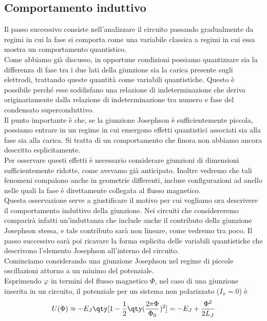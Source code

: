 \subsection{Comportamento induttivo}
Il passo successivo consiste nell'analizzare il circuito passando gradualmente da regimi in cui la fase si comporta come una variabile classica a regimi in cui essa mostra un comportamento quantistico.\\
Come abbiamo già discusso, in opportune condizioni possiamo quantizzare sia la differenza di fase tra i due lati della giunzione sia la carica presente sugli elettrodi, trattando queste quantità come variabili quantistiche. Questo è possibile perché esse soddisfano una relazione di indeterminazione che deriva originariamente dalla relazione di indeterminazione tra numero e fase del condensato superconduttivo.\\
Il punto importante è che, se la giunzione Josephson è sufficientemente piccola, possiamo entrare in un regime in cui emergono effetti quantistici associati sia alla fase sia alla carica. Si tratta di un comportamento che finora non abbiamo ancora descritto esplicitamente.\\
Per osservare questi effetti è necessario considerare giunzioni di dimensioni sufficientemente ridotte, come avevamo già anticipato. Inoltre vedremo che tali fenomeni compaiono anche in geometrie differenti, incluse configurazioni ad anello nelle quali la fase è direttamente collegata al flusso magnetico.\\
Questa osservazione serve a giustificare il motivo per cui vogliamo ora descrivere il comportamento induttivo della giunzione. Nei circuiti che considereremo comparirà infatti un'induttanza che include anche il contributo della giunzione Josephson stessa, e tale contributo sarà non lineare, come vedremo tra poco. Il passo successivo sarà poi ricavare la forma esplicita delle variabili quantistiche che descrivono l'elemento Josephson all'interno del circuito.\\
Cominciamo considerando una giunzione Josephson nel regime di piccole oscillazioni attorno a un minimo del potenziale.\\
Esprimendo $\varphi$ in termini del flusso magnetico $\Phi$, nel caso di una giunzione inserita in un circuito, il potenziale per un sistema non polarizzato ($I_x=0$) è
\begin{equation*}
    U(\Phi)
    \approx
    -E_J
    \qty[
        1
        -
        \frac{1}{2}
        \qty(
            \frac{2\pi\Phi}{\Phi_0}
        )^2
    ]
    =
    -E_J
    +
    \frac{\Phi^2}{2L_J}
\end{equation*}

